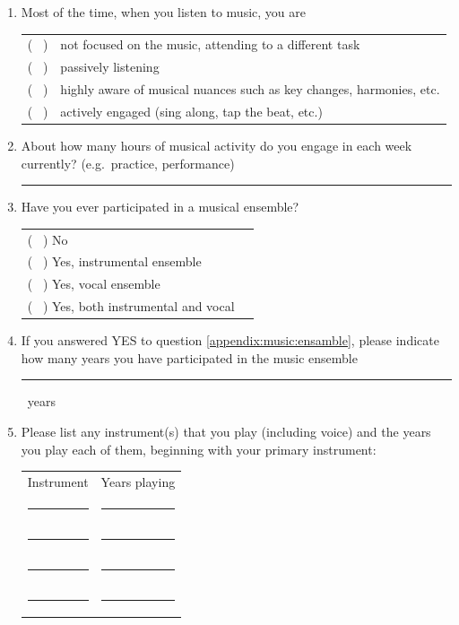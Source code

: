 \documentclass[a4paper,11pt]{article}
\newcommand{\myunderline}{\rule{2in}{.5pt}}
\begin{document}
\begin{appendices}
\begin{enumerate}[resume]
	\item Most of the time, when you listen to music, you are

	\begin{tabular}{l l}
		( \ ) & not focused on the music, attending to a different task \\
		( \ ) & passively listening \\
		( \ ) & highly aware of musical nuances such as key changes, harmonies, etc. \\
		( \ ) & actively engaged (sing along, tap the beat, etc.) \\
	\end{tabular}

	\item About how many hours of musical activity do you engage in each week currently? (e.g.\ practice, performance)

	\myunderline

	\item \label{appendix:music:ensamble}Have you ever participated in a musical ensemble?

	\begin{tabular}{l l}
		( \ ) No \\
		( \ ) Yes, instrumental ensemble \\
		( \ ) Yes, vocal ensemble \\
		( \ ) Yes, both instrumental and vocal \\
	\end{tabular}

	\item If you answered YES to question \ref{appendix:music:ensamble}, please indicate how many years you have participated in the music ensemble

	\myunderline \ years

	\item Please list any instrument(s) that you play (including voice) and the years you play each of them, beginning with your primary instrument:

	\begin{tabular}{c c}
		Instrument &  Years playing \\
		\myunderline & \myunderline \\
		\myunderline & \myunderline \\
		\myunderline & \myunderline \\
		\myunderline & \myunderline \\
	\end{tabular}
	

\end{enumerate}
\end{appendices}
\end{document}
